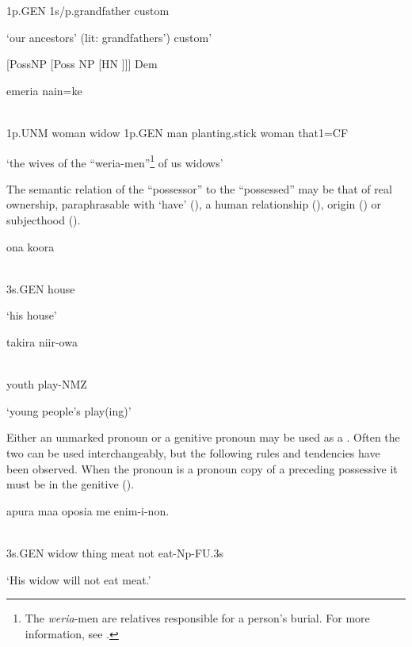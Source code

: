 1p.GEN  1s/p.grandfather  custom

`our ancestors' (lit: grandfathers') custom'

[PossNP          [Poss NP            [HN ]]]   Dem 

\ea%
\label{ex:x405}
\gll {}    emeria  nain=ke \\
      \\
\glt
\z

1p.UNM  woman  widow  1p.GEN  man  planting.stick  woman  that1=CF

`the wives of the ``weria-men''\footnote{The \textit{weria}-men are relatives responsible for a person's burial. For more information, see .} of us widows'

The semantic relation of the ``possessor'' to the ``possessed'' may be that of real ownership, paraphrasable with `have' (), a human relationship (), origin () or subjecthood (). 

\ea%
\label{ex:x406}
\gll ona  koora \\
      \\
\glt
\z

3s.GEN  house

`his house'

\ea%
\label{ex:x407}
\gll takira  niir-owa \\
      \\
\glt
\z

youth  play-NMZ

`young  people's play(ing)'

Either an unmarked pronoun or a genitive pronoun may be used as a . Often the two can be used interchangeably, but the following rules and tendencies have been observed. When the pronoun is a pronoun copy of a preceding possessive  it must be in the genitive (). 

\ea%
\label{ex:x409}
\gll {}  apura  maa  oposia  me  enim-i-non. \\
      \\
\glt
\z

3s.GEN  widow  thing  meat  not  eat-Np-FU.3s

`His widow will not eat meat.'

